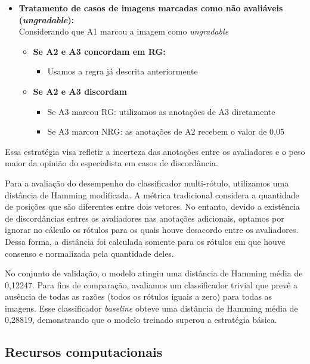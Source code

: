 \documentclass[12pt]{article}
\begin{document}
\begin{itemize}[noitemsep]
    \item \textbf{Tratamento de casos de imagens marcadas como não avaliáveis (\emph{ungradable}):}\\
    Considerando que A1 marcou a imagem como \emph{ungradable}
    \begin{itemize}[noitemsep]
        \item \textbf{Se A2 e A3 concordam em RG:}
        \begin{itemize}[noitemsep]
            \item Usamos a regra já descrita anteriormente
        \end{itemize}
        
        \item \textbf{Se A2 e A3 discordam}
        \begin{itemize}[noitemsep]
            \item Se A3 marcou RG: utilizamos as anotações de A3 diretamente
            \item Se A3 marcou NRG: as anotações de A2 recebem o valor de 0,05
        \end{itemize}
    \end{itemize}
    
\end{itemize}

Essa estratégia visa refletir a incerteza das anotações entre os avaliadores e o peso maior da opinião do especialista em casos de discordância.

Para a avaliação do desempenho do classificador multi-rótulo, utilizamos uma distância de Hamming modificada. A métrica tradicional considera a quantidade de posições que são diferentes entre dois vetores. No entanto, devido a existência de discordâncias entres os avaliadores nas anotações adicionais, optamos por ignorar no cálculo os rótulos para os quais houve desacordo entre os avaliadores. Dessa forma, a distância foi calculada somente para os rótulos em que houve consenso e normalizada pela quantidade deles. 

No conjunto de validação, o modelo atingiu uma distância de Hamming média de 0,12247. Para fins de comparação, avaliamos um classificador trivial que prevê a ausência de todas as razões (todos os rótulos iguais a zero) para todas as imagens. Esse classificador \textit{baseline} obteve uma distância de Hamming média de 0,28819, demonstrando que o modelo treinado superou a estratégia básica.

\subsection{Recursos computacionais}
\label{sec:resources}
\end{document}
